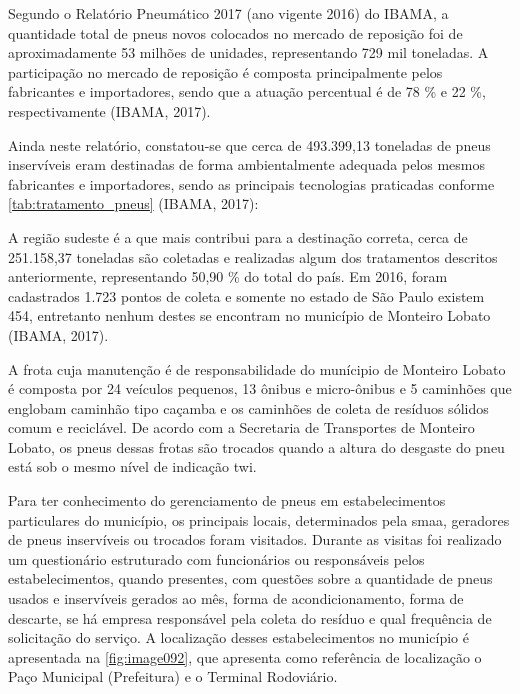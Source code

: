 \begin{description}
		Segundo o Relatório Pneumático 2017 (ano vigente 2016) do IBAMA, a quantidade total de pneus novos colocados no mercado de reposição foi de aproximadamente 53 milhões de unidades, representando 729 mil toneladas. A participação no mercado de reposição é composta principalmente pelos fabricantes e importadores, sendo que a atuação percentual é de 78 \% e 22 \%, respectivamente (IBAMA, 2017).
	
		Ainda neste relatório, constatou-se que cerca de 493.399,13 toneladas de pneus inservíveis eram destinadas de forma ambientalmente adequada pelos mesmos fabricantes e importadores, sendo as principais tecnologias praticadas conforme \autoref{tab:tratamento_pneus} (IBAMA, 2017):	
	
		
	
		A região sudeste é a que mais contribui para a destinação correta, cerca de 251.158,37 toneladas são coletadas e realizadas algum dos tratamentos descritos anteriormente, representando 50,90 \% do total do país. Em 2016, foram cadastrados 1.723 pontos de coleta e somente no estado de São Paulo existem 454, entretanto nenhum destes se encontram no município de Monteiro Lobato (IBAMA, 2017).

		A frota cuja manutenção é de responsabilidade do munícipio de Monteiro Lobato é composta por 24 veículos pequenos, 13 ônibus e micro-ônibus e 5 caminhões que englobam caminhão tipo caçamba e os caminhões de coleta de resíduos sólidos comum e reciclável. De acordo com a Secretaria de Transportes de Monteiro Lobato, os pneus dessas frotas são trocados quando a altura do desgaste do pneu está sob o mesmo nível de indicação \gls{twi}.
	
		Para ter conhecimento do gerenciamento de pneus em estabelecimentos particulares do município, os principais locais, determinados pela \gls{smaa}, geradores de pneus inservíveis ou trocados foram visitados. Durante as visitas foi realizado um questionário estruturado com funcionários ou responsáveis pelos estabelecimentos, quando presentes, com questões sobre a quantidade de pneus usados e inservíveis gerados ao mês, forma de acondicionamento, forma de descarte, se há empresa responsável pela coleta do resíduo e qual frequência de solicitação do serviço. A localização desses estabelecimentos no município é apresentada na \autoref{fig:image092}, que apresenta como referência de localização o Paço Municipal (Prefeitura) e o Terminal Rodoviário.
	

\end{description}
